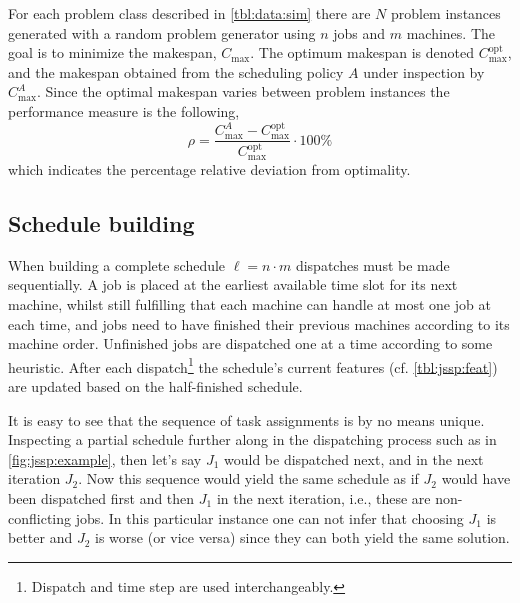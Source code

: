 \documentclass[smallextended]{svjour3}
\begin{document}
For each problem class described in \cref{tbl:data:sim} there are $N$ problem 
instances generated with a random problem generator using $n$ jobs and $m$ 
machines.  The goal is to minimize the makespan, $C_{\max}$. The optimum 
makespan is denoted $C_{\max}^{\text{opt}}$, and the makespan obtained from the 
scheduling policy $A$ under inspection by $C_{\max}^{A}$. Since the optimal 
makespan varies between problem instances the performance measure is the 
following,
\begin{equation}\label{eq:ratio}
	\rho=\frac{C_{\max}^{A}-C_{\max}^{\text{opt}}}{C_{\max}^{\text{opt}}}\cdot
	100\%
\end{equation}
which indicates the percentage relative deviation from optimality. %

\subsection{Schedule building}\label{sec:gen:gametree}
When building a complete schedule $\ell=n\cdot m$ dispatches must be made 
sequentially.  A job is placed at the earliest available time slot for its next 
machine, whilst still fulfilling that each machine can handle at most one job 
at each time, and jobs need to have finished their previous machines according 
to its machine order. Unfinished jobs are dispatched one at a time according to 
some heuristic. After each dispatch\footnote{Dispatch and time step are used 
	interchangeably.} the schedule's current features (cf. \cref{tbl:jssp:feat}) 
are updated based on the half-finished schedule.

It is easy to see that the sequence of task assignments is by no means unique. 
Inspecting a partial schedule further along in the dispatching process such as 
in \cref{fig:jssp:example}, then let's say $J_1$ would be dispatched next, and 
in the next iteration $J_2$. Now this sequence would yield the same schedule as 
if $J_2$ would have been dispatched first and then $J_1$ in the next iteration, 
i.e., these are non-conflicting jobs.  In this particular instance one can not 
infer that choosing $J_1$ is better and $J_2$ is worse (or vice versa) since
they can both yield the same solution. 
\end{document}

